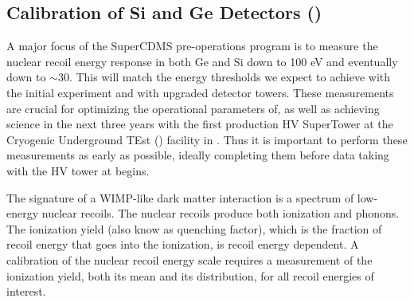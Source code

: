
\subsection{Calibration of Si and Ge \scs Detectors ()}

\label{sec:calibration}

A major focus of the SuperCDMS pre-operations program is to measure the nuclear recoil energy response in both Ge and Si down to 100 eV and eventually down to $\sim$30\eV.  This will match the energy thresholds we expect to achieve with the initial experiment and with upgraded detector towers.  These measurements are crucial for optimizing the operational parameters of, as well as achieving science in the next three years with the first production HV SuperTower at the Cryogenic Underground TEst (\cute) facility in \SNOLAB. Thus it is important to perform these measurements as early as possible, ideally completing them before data taking with the HV tower at \cute begins.

The signature of a WIMP-like dark matter interaction is a spectrum of low-energy nuclear recoils.  The nuclear recoils produce both ionization and phonons.  The ionization yield (also know as quenching factor), which is the fraction of recoil energy that goes into the ionization, is recoil energy dependent.  A calibration of the nuclear recoil energy scale requires a measurement of the ionization yield, both its mean and its distribution, for all recoil energies of interest.


